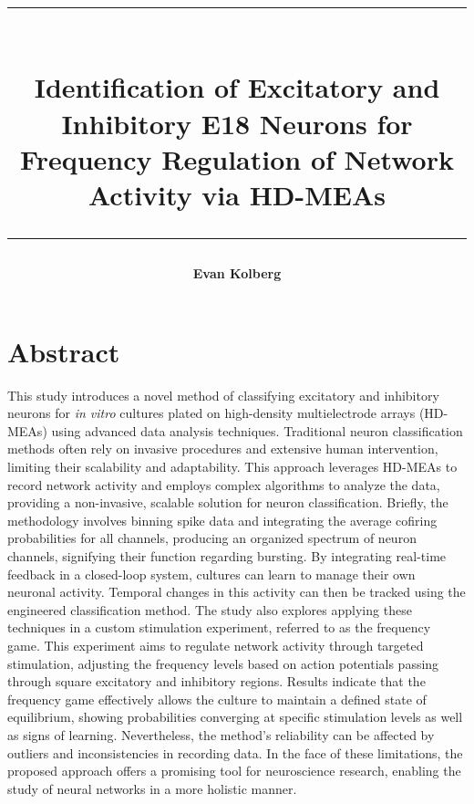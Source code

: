 \documentclass{article} %
\title{
    \vspace{6cm}
    \fontsize{20pt}{24pt}
    \rule{\textwidth}{0.8pt} \\[0.5ex]
    \vspace{-0.5ex}
    \textbf{Identification of Excitatory and Inhibitory E18 Neurons for Frequency Regulation of Network Activity via HD-MEAs} \\[0.5ex]
    \vspace{-2ex}
    \rule{\textwidth}{0.8pt}
}
\author{\textbf{Evan Kolberg}}
\date{}
\begin{document}
\fontsize{11pt}{15pt}\selectfont


\captionsetup[figure]{
    labelfont=bf,
    labelsep=period,
    font=normalsize,
    justification=justified,
    singlelinecheck=false
}

\captionsetup[subfigure]{
    labelfont=bf,
    labelsep=space,
    font=normalsize,
    justification=centering,
    singlelinecheck=false
}

\maketitle
\thispagestyle{fancy}

\newpage

\section*{Abstract}
This study introduces a novel method of classifying excitatory and inhibitory neurons for \textit{in vitro} cultures plated on high-density multielectrode arrays (HD-MEAs) using advanced data analysis techniques. Traditional neuron classification methods often rely on invasive procedures and extensive human intervention, limiting their scalability and adaptability. This approach leverages HD-MEAs to record network activity and employs complex algorithms to analyze the data, providing a non-invasive, scalable solution for neuron classification. Briefly, the methodology involves binning spike data and integrating the average cofiring probabilities for all channels, producing an organized spectrum of neuron channels, signifying their function regarding bursting. By integrating real-time feedback in a closed-loop system, cultures can learn to manage their own neuronal activity. Temporal changes in this activity can then be tracked using the engineered classification method. The study also explores applying these techniques in a custom stimulation experiment, referred to as the frequency game. This experiment aims to regulate network activity through targeted stimulation, adjusting the frequency levels based on action potentials passing through square excitatory and inhibitory regions. Results indicate that the frequency game effectively allows the culture to maintain a defined state of equilibrium, showing probabilities converging at specific stimulation levels as well as signs of learning. Nevertheless, the method's reliability can be affected by outliers and inconsistencies in recording data. In the face of these limitations, the proposed approach offers a promising tool for neuroscience research, enabling the study of neural networks in a more holistic manner. 
\end{document}
